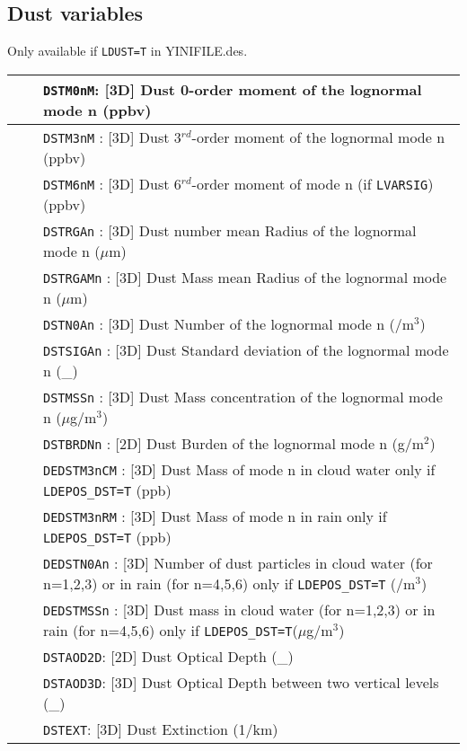 \subsection{Dust variables}
Only available if \verb|LDUST=T| in YINIFILE.des.
\begin{center}
\begin{makeimage}
\begin{tabular}{|>{\centering}p{3cm}|>{\centering}p{2.5cm}|p{11cm}|}
\hline
\multirow{23}{*}{by default}& &{\tt DSTM0nM}: [3D] Dust 0-order moment of the lognormal mode n (ppbv)\\\cline{3-3}
& &{\tt DSTM3nM} : [3D] Dust 3$^{rd}$-order moment of the lognormal mode n (ppbv)\\\cline{3-3}
& &{\tt DSTM6nM} : [3D] Dust 6$^{rd}$-order moment of mode n 
              {\small(if {\tt LVARSIG})} (ppbv)\\\cline{3-3}
& &{\tt DSTRGAn} : [3D] Dust number mean Radius of the lognormal mode n ($\mu$m)
\\\cline{3-3}
& &{\tt DSTRGAMn} : [3D] Dust Mass mean Radius of the lognormal mode n ($\mu$m)\\\cline{3-3}
& &{\tt DSTN0An} : [3D] Dust Number of the lognormal mode n (/m$^3$)\\\cline{3-3}
& &{\tt DSTSIGAn} : [3D] Dust Standard deviation of the lognormal mode n (\_)\\\cline{3-3}
& &{\tt DSTMSSn} : [3D] Dust Mass concentration of the lognormal mode n 
($\mu$g/m$^3$)\\\cline{3-3}
& &{\tt DSTBRDNn} : [2D] Dust Burden of the lognormal mode n (g/m$^2$)\\\cline{3-3}
& &{\tt DEDSTM3nCM}  : [3D] Dust Mass of mode n in cloud water only if \verb|LDEPOS_DST=T| (ppb) \\\cline{3-3}
& &{\tt DEDSTM3nRM}  : [3D]  Dust Mass of mode n in rain only if \verb|LDEPOS_DST=T| (ppb)\\\cline{3-3}
& &{\tt DEDSTN0An} : [3D] Number of dust particles in cloud water (for n=1,2,3) or in rain (for n=4,5,6) only if \verb|LDEPOS_DST=T| (/m$^3$)\\\cline{3-3}
& &{\tt DEDSTMSSn} : [3D] Dust mass in cloud water (for n=1,2,3) or in rain (for n=4,5,6) only if \verb|LDEPOS_DST=T|($\mu$g/m$^3$)\\\cline{1-3}
\multirow{3}{*}{NRAD\_3D}& \multirow{3}{*}{$\ge$ 1}&{\tt DSTAOD2D}: [2D] Dust Optical Depth (\_)\\\cline{3-3}
& &{\tt DSTAOD3D}: [3D] Dust Optical Depth between two vertical levels (\_)
\\\cline{3-3}
& &{\tt DSTEXT}: [3D] Dust Extinction (1/km)\\\hline
\end{tabular}
\end{makeimage} 
\end{center}
\newpage
